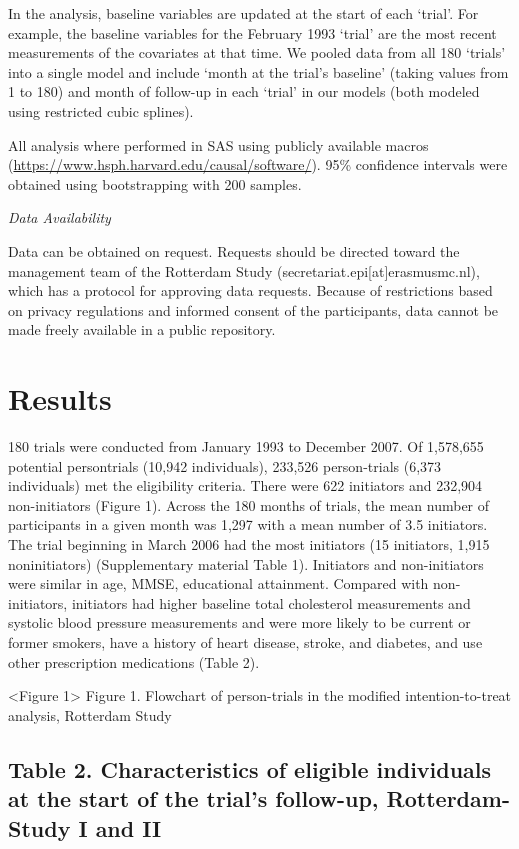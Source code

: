 \documentclass[
]{book}
\begin{document}
In the analysis, baseline variables are updated at the start of each `trial'. For example, the baseline variables for the February 1993 `trial' are the most recent measurements of the covariates at that time. We pooled data from all 180 `trials' into a single model and include `month at the trial's baseline' (taking values from 1 to 180) and month of follow-up in each `trial' in our models (both modeled using restricted cubic splines).

All analysis where performed in SAS using publicly available macros (\url{https://www.hsph.harvard.edu/causal/software/}). 95\% confidence intervals were obtained using bootstrapping with 200 samples.

\emph{Data Availability}

Data can be obtained on request. Requests should be directed toward the management team of the Rotterdam Study (secretariat.epi{[}at{]}erasmusmc.nl), which has a protocol for approving data requests. Because of restrictions based on privacy regulations and informed consent of the participants, data cannot be made freely available in a public repository.

\hypertarget{results}{%
\section{Results}\label{results}}

180 trials were conducted from January 1993 to December 2007. Of 1,578,655 potential persontrials (10,942 individuals), 233,526 person-trials (6,373 individuals) met the eligibility criteria. There were 622 initiators and 232,904 non-initiators (Figure 1). Across the 180 months of trials, the mean number of participants in a given month was 1,297 with a mean number of 3.5 initiators. The trial beginning in March 2006 had the most initiators (15 initiators, 1,915 noninitiators) (Supplementary material Table 1). Initiators and non-initiators were similar in age, MMSE, educational attainment. Compared with non-initiators, initiators had higher baseline total cholesterol measurements and systolic blood pressure measurements and were more likely to be current or former smokers, have a history of heart disease, stroke, and diabetes, and use other prescription medications (Table 2).

\textless Figure 1\textgreater{}
Figure 1. Flowchart of person-trials in the modified intention-to-treat analysis, Rotterdam Study

\hypertarget{table-2.-characteristics-of-eligible-individuals-at-the-start-of-the-trials-follow-up-rotterdam-study-i-and-ii}{%
\subsection{Table 2. Characteristics of eligible individuals at the start of the trial's follow-up, Rotterdam-Study I and II}\label{table-2.-characteristics-of-eligible-individuals-at-the-start-of-the-trials-follow-up-rotterdam-study-i-and-ii}}
\end{document}
